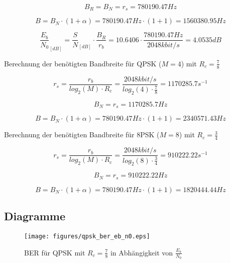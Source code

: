 \documentclass[12pt,a4paper,ngerman]{article}
\begin{document}
\begin{equation}\label{eq:bn_8psk_7_8}
 B_R = B_N = r_s = 780190.47 Hz
\end{equation}

\begin{equation}
 B = B_N \cdot (1 + \alpha) = 780190.47 Hz \cdot (1 + 1) = 1560380.95 Hz
\end{equation}

\begin{equation}
 \frac{E_b}{N_0}_{[dB]} = \frac{S}{N}_{[dB]} \cdot \frac{B_R}{r_b} = 10.6406 \cdot \frac{780190.47 Hz}{2048 kbit/s} = 4.0535 dB
\end{equation}

Berechnung der benötigten Bandbreite für QPSK ($M = 4$) mit $R_c = \frac{7}{8}$

\begin{equation}
 r_s = \frac{r_b}{log_2(M) \cdot R_c} = \frac{2048 kbit/s}{log_2(4) \cdot \frac{7}{8}} = 1170285.7 s^{-1}
\end{equation}

\begin{equation}\label{eq:bn_qpsk_7_8}
 B_N = r_s = 1170285.7 Hz
\end{equation}

\begin{equation}
 B = B_N \cdot (1 + \alpha) = 780190.47 Hz \cdot (1 + 1) = 2340571.43 Hz
\end{equation}

Berechnung der benötigten Bandbreite für 8PSK ($M = 8$) mit $R_c = \frac{3}{4}$

\begin{equation}
 r_s = \frac{r_b}{log_2(M) \cdot R_c} = \frac{2048 kbit/s}{log_2(8) \cdot \frac{3}{4}} = 910222.22 s^{-1}
\end{equation}

\begin{equation}\label{eq:bn_8psk_3_4}
 B_N = r_s = 910222.22 Hz
\end{equation}

\begin{equation}
 B = B_N \cdot (1 + \alpha) = 780190.47 Hz \cdot (1 + 1) = 1820444.44 Hz
\end{equation}
\pagebreak
\subsection{Diagramme}
\begin{figure}[h!]
\hspace*{-3cm}\texttt{[image: figures/qpsk\_ber\_eb\_n0.eps]} 
\caption{BER für QPSK mit $R_c = \frac{7}{8}$ in Abhängigkeit von $\frac{E_b}{N_0}$}
	\label{fig:ber_qpsk}
	\end{figure}
	
\end{document}
